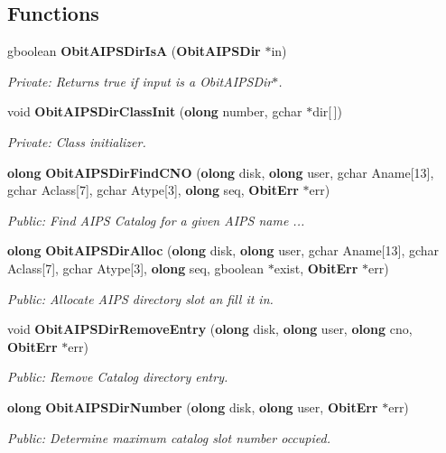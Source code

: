 \subsection*{Functions}
\begin{CompactItemize}
\item 
gboolean {\bf Obit\-AIPSDir\-Is\-A} ({\bf Obit\-AIPSDir} $\ast$in)
\begin{CompactList}\small\item\em Private: Returns true if input is a Obit\-AIPSDir$\ast$. \item\end{CompactList}\item 
void {\bf Obit\-AIPSDir\-Class\-Init} ({\bf olong} number, gchar $\ast$dir[$\,$])
\begin{CompactList}\small\item\em Private: Class initializer. \item\end{CompactList}\item 
{\bf olong} {\bf Obit\-AIPSDir\-Find\-CNO} ({\bf olong} disk, {\bf olong} user, gchar Aname[13], gchar Aclass[7], gchar Atype[3], {\bf olong} seq, {\bf Obit\-Err} $\ast$err)
\begin{CompactList}\small\item\em Public: Find AIPS Catalog for a given AIPS name ... \item\end{CompactList}\item 
{\bf olong} {\bf Obit\-AIPSDir\-Alloc} ({\bf olong} disk, {\bf olong} user, gchar Aname[13], gchar Aclass[7], gchar Atype[3], {\bf olong} seq, gboolean $\ast$exist, {\bf Obit\-Err} $\ast$err)
\begin{CompactList}\small\item\em Public: Allocate AIPS directory slot an fill it in. \item\end{CompactList}\item 
void {\bf Obit\-AIPSDir\-Remove\-Entry} ({\bf olong} disk, {\bf olong} user, {\bf olong} cno, {\bf Obit\-Err} $\ast$err)
\begin{CompactList}\small\item\em Public: Remove Catalog directory entry. \item\end{CompactList}\item 
{\bf olong} {\bf Obit\-AIPSDir\-Number} ({\bf olong} disk, {\bf olong} user, {\bf Obit\-Err} $\ast$err)
\begin{CompactList}\small\item\em Public: Determine maximum catalog slot number occupied. \item\end{CompactList}\item 

\end{CompactItemize}
